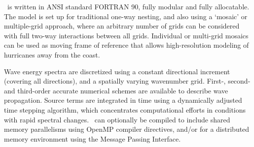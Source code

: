 \ws\ is written in ANSI standard FORTRAN 90, fully modular and fully allocatable. The model is set up for traditional one-way nesting, 
and also using a `mosaic' or multiple-grid approach, where an arbitrary number of grids can be considered with full two-way interactions 
between all grids. Individual or multi-grid mosaics can be used as moving frame of reference that allows high-resolution 
modeling of hurricanes away from the coast. 

Wave energy spectra are discretized using a constant directional increment (covering all directions), and a spatially varying wavenumber grid.  
First-, second- and third-order accurate numerical schemes are available to describe wave propagation. Source terms are integrated 
in time using a dynamically adjusted time stepping algorithm, which concentrates computational efforts in conditions with rapid spectral 
changes. \ws\ can optionally be compiled to include shared memory parallelisms using OpenMP compiler directives, 
and/or for a distributed memory environment using the Message Passing Interface.




